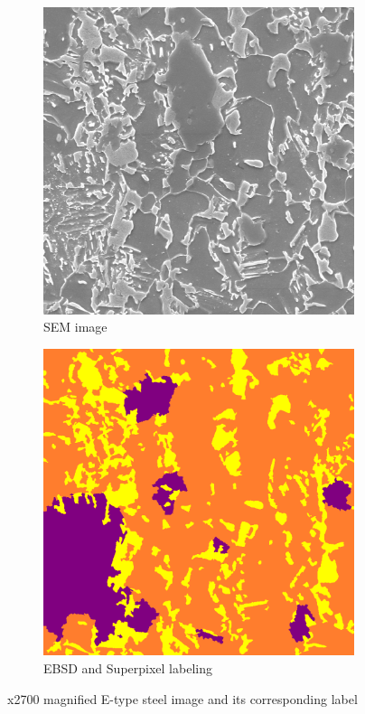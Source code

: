 \documentclass[]{article}
\begin{document}
\begin{figure}[ht]
	\centering
	\begin{subfigure}[b]{0.45\textwidth}
		\centering
		\includegraphics[width=\textwidth]{images/1.png}
		\caption{SEM image}
		\label{fig:image1}
	\end{subfigure}
	\hfill
	\begin{subfigure}[b]{0.45\textwidth}
		\centering
		\includegraphics[width=\textwidth]{images/1_label.png}
		\caption{EBSD and Superpixel labeling }
		\label{fig:image2}
	\end{subfigure}
	\caption{x2700 magnified E-type steel image and its corresponding label}
	\label{fig:combined}
\end{figure}
\end{document}
